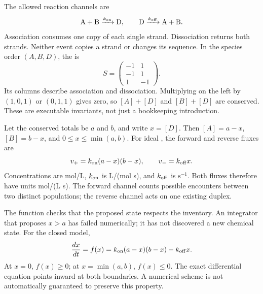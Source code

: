 The allowed reaction channels are
\begin{equation}
 \mathrm{A+B}\xrightarrow{k_{\rm on}}\mathrm{D},
 \qquad \mathrm{D}\xrightarrow{k_{\rm off}}\mathrm{A+B}.
\end{equation}
Association consumes one copy of each single strand. Dissociation returns
both strands. Neither event copies a strand or changes its sequence.
In the species order $(A,B,D)$, the  is
\begin{equation}
 S=\begin{pmatrix}-1&1\\-1&1\\1&-1\end{pmatrix}.
 \label{eq:stoich}
\end{equation}
Its columns describe association and dissociation. Multiplying on the left
by $(1,0,1)$ or $(0,1,1)$ gives zero, so $[A]+[D]$ and $[B]+[D]$ are conserved.
These are executable invariants, not just a bookkeeping introduction.


Let the conserved totals be $a$ and $b$, and write $x=[D]$. Then
$[A]=a-x$, $[B]=b-x$, and $0\leq x\leq\min(a,b)$. For ideal
, the forward and reverse fluxes are
\begin{equation}
 v_+=k_{\rm on}(a-x)(b-x),\qquad v_-=k_{\rm off}x.
 \label{eq:flux}
\end{equation}
Concentrations are mol/L, $k_{\rm on}$ is L/(mol s), and $k_{\rm off}$ is
$\mathrm{s}^{-1}$. Both fluxes therefore have units mol/(L s).
The forward channel counts possible encounters between two distinct
populations; the reverse channel acts on one existing duplex.


The function checks that the proposed state respects the inventory.
An integrator that proposes $x>a$ has failed numerically; it has not
discovered a new chemical state. For the closed model,
\begin{equation}
 \frac{dx}{dt}=f(x)=k_{\rm on}(a-x)(b-x)-k_{\rm off}x.
 \label{eq:ode}
\end{equation}
At $x=0$, $f(x)\geq0$; at $x=\min(a,b)$, $f(x)\leq0$.
The exact differential equation points inward at both boundaries.
A numerical scheme is not automatically guaranteed to preserve this property.

